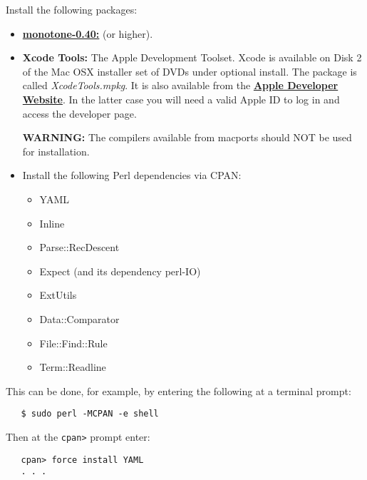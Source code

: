 \documentclass[12pt]{article}
\begin{document}
Install the following packages:
\begin{itemize}
   \item[]\href{http://monotone.ca/}{\bf monotone-0.40:} (or higher).
   \item[]{\bf Xcode Tools:} The Apple Development Toolset. Xcode is available on Disk 2 of the Mac OSX installer set of DVDs under optional install. The package is called {\it  XcodeTools.mpkg}. It is also available from the \href{http://developer.apple.com/technology/xcode.html}{\bf Apple Developer Website}. In the latter case  you will need a valid Apple ID to log in and access the developer page.
   
   {\bf WARNING:} The compilers available from macports should NOT be used for installation.
   \item[]Install the following Perl dependencies via CPAN:
      \begin{itemize}
         \item YAML
         \item Inline
         \item Parse::RecDescent
         \item Expect (and its dependency perl-IO)
         \item ExtUtils
         \item Data::Comparator
         \item File::Find::Rule
         \item Term::Readline
      \end{itemize}
   \end{itemize}
This can be done, for example, by entering the following at a terminal prompt:
\begin{verbatim}
   $ sudo perl -MCPAN -e shell
\end{verbatim}
Then at the {\tt cpan>} prompt enter:
\begin{verbatim}
   cpan> force install YAML
   . . . 
\end{verbatim}
   
\end{document}
